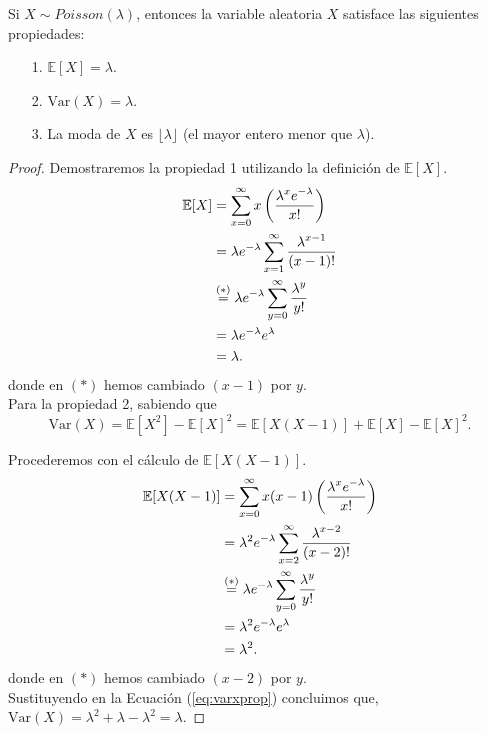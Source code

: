 \documentclass[oneside,openright,titlepage,numbers=noenddot,openany,headinclude,footinclude=true,
cleardoublepage=empty,abstractoff,BCOR=5mm,paper=a4,fontsize=12pt,main=spanish]{scrreprt}
\begin{document}
\begin{proposition}
Si $X \sim Poisson(\lambda)$, entonces la variable aleatoria $X$ satisface las siguientes propiedades:
\begin{itemize}
    \item[1.] $\mathbb{E}[X]=\lambda$.
    \item[2.] $\text{Var}(X)=\lambda$.
    \item[3.] La moda de $X$ es $\lfloor \lambda \rfloor$ (el mayor entero menor que $\lambda$).
\end{itemize}
\end{proposition}

\begin{proof}
  Demostraremos la propiedad 1 utilizando la definición de $\mathbb{E}[X]$. \\
  \begin{equation*}
  \begin{split}
  \mathbb{E}[X]&=\sum_{x=0}^\infty x \left(\frac{\displaystyle \lambda^x e^{-\lambda}}{\displaystyle x!}\right)\\
  &=\lambda e^{-\lambda} \sum_{x=1}^\infty \frac{\displaystyle \lambda^{x-1}}{\displaystyle (x-1)!}\\
  &\overset{(*)}{=}\lambda e^{-\lambda} \sum_{y=0}^\infty \frac{\displaystyle \lambda^{y}}{\displaystyle y!}\\
  &=\lambda e^{-\lambda} e^{\lambda}\\
  &=\lambda.
  \end{split}
  \end{equation*} donde en $(*)$ hemos cambiado $(x-1)$ por $y$.\\
  
  Para la propiedad 2, sabiendo que
  \begin{equation}\label{eq:varxprop}
    \text{Var}(X)=\mathbb{E}[X^2]-\mathbb{E}[X]^2=\mathbb{E}[X(X-1)]+\mathbb{E}[X]-\mathbb{E}[X]^2.
  \end{equation}
  
  Procederemos con el cálculo de $\mathbb{E}[X(X-1)]$. \begin{equation*}
  \begin{split}
 \mathbb{E}[X(X-1)]&=\sum_{x=0}^\infty x(x-1)\left(\frac{\displaystyle \lambda^x e^{-\lambda}}{\displaystyle x!}\right)\\
 &=\lambda^2 e^{-\lambda} \sum_{x=2}^\infty \frac{\displaystyle \lambda^{x-2}}{\displaystyle (x-2)!}\\ &\overset{(*)}{=}\lambda e^{-\lambda} \sum_{y=0}^\infty \frac{\displaystyle \lambda^{y}}{\displaystyle y!}\\
 &=\lambda^2 e^{-\lambda} e^{\lambda}\\
 &=\lambda^2.
  \end{split}
  \end{equation*} donde en $(*)$ hemos cambiado $(x-2)$ por $y$.\\
  
  Sustituyendo en la Ecuación (\ref{eq:varxprop}) concluimos que, $\text{Var}(X)=\lambda^2+\lambda-\lambda^2=\lambda.$
\end{proof}\
\end{document}
